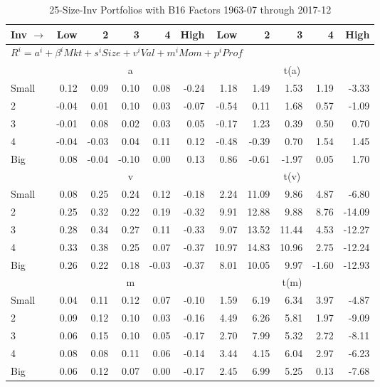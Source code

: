 
\begin{table}[!ht]
\footnotesize
\centering
\caption{25-Size-Inv Portfolios with B16 Factors 1963-07 through 2017-12}
\begin{tabular}{lrrrrrrrrrr}
  \toprule
    
    Inv $\rightarrow$ & Low & 2 & 3 & 4 & High & Low & 2 & 3 & 4 & High  \\ 
  \midrule
  \multicolumn{11}{l}{$R^i=a^i+\beta^iMkt+s^iSize+v^iVal+m^iMom+p^iProf$}  \\
  
     & \multicolumn{5}{c}{a} & \multicolumn{5}{c}{t(a)}   \\
     \cmidrule(r){2-6} \cmidrule(r){7-11} 
    Small  & 0.12  & 0.09  & 0.10  & 0.08  & -0.24  & 1.18  & 1.49  & 1.53  & 1.19  & -3.33   \\
    2  & -0.04  & 0.01  & 0.10  & 0.03  & -0.07  & -0.54  & 0.11  & 1.68  & 0.57  & -1.09   \\
    3  & -0.01  & 0.08  & 0.02  & 0.03  & 0.05  & -0.17  & 1.23  & 0.39  & 0.50  & 0.70   \\
    4  & -0.04  & -0.03  & 0.04  & 0.11  & 0.12  & -0.48  & -0.39  & 0.70  & 1.54  & 1.45   \\
    Big  & 0.08  & -0.04  & -0.10  & 0.00  & 0.13  & 0.86  & -0.61  & -1.97  & 0.05  & 1.70   \\
    
  
     & \multicolumn{5}{c}{v} & \multicolumn{5}{c}{t(v)}   \\
     \cmidrule(r){2-6} \cmidrule(r){7-11} 
    Small  & 0.08  & 0.25  & 0.24  & 0.12  & -0.18  & 2.24  & 11.09  & 9.86  & 4.87  & -6.80   \\
    2  & 0.25  & 0.32  & 0.22  & 0.19  & -0.32  & 9.91  & 12.88  & 9.88  & 8.76  & -14.09   \\
    3  & 0.28  & 0.34  & 0.27  & 0.11  & -0.33  & 9.07  & 13.52  & 11.44  & 4.53  & -12.27   \\
    4  & 0.33  & 0.38  & 0.25  & 0.07  & -0.37  & 10.97  & 14.83  & 10.96  & 2.75  & -12.24   \\
    Big  & 0.26  & 0.22  & 0.18  & -0.03  & -0.37  & 8.01  & 10.05  & 9.97  & -1.60  & -12.93   \\
    
  
     & \multicolumn{5}{c}{m} & \multicolumn{5}{c}{t(m)}   \\
     \cmidrule(r){2-6} \cmidrule(r){7-11} 
    Small  & 0.04  & 0.11  & 0.12  & 0.07  & -0.10  & 1.59  & 6.19  & 6.34  & 3.97  & -4.87   \\
    2  & 0.09  & 0.12  & 0.10  & 0.03  & -0.16  & 4.49  & 6.26  & 5.81  & 1.97  & -9.09   \\
    3  & 0.06  & 0.15  & 0.10  & 0.05  & -0.17  & 2.70  & 7.99  & 5.32  & 2.72  & -8.11   \\
    4  & 0.08  & 0.08  & 0.11  & 0.06  & -0.14  & 3.44  & 4.15  & 6.04  & 2.97  & -6.23   \\
    Big  & 0.06  & 0.12  & 0.07  & 0.00  & -0.17  & 2.45  & 6.99  & 5.25  & 0.13  & -7.68   \\


\end{tabular}
\end{table}
